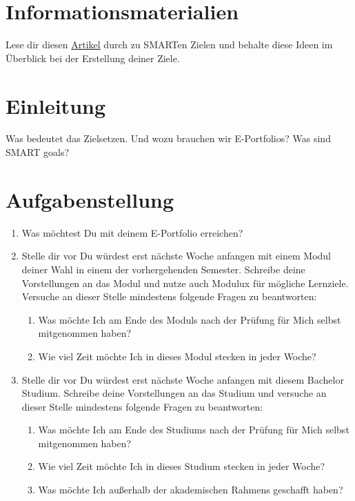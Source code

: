 \documentclass[a4paper,oneside]{scrarticle}
\begin{document}
	\pagebreak 
	
	\section*{Informationsmaterialien}
	Lese dir diesen \href{https://www.atlassian.com/blog/productivity/how-to-write-smart-goals}{Artikel} durch zu SMARTen Zielen und behalte diese Ideen im Überblick bei der Erstellung deiner Ziele.\\
	
	
	
	
	
	\pagebreak
		
	\section*{Einleitung}
	Was bedeutet das Zielsetzen. Und wozu brauchen wir E-Portfolios? Was sind SMART goals?
	
	\section*{Aufgabenstellung}

	\begin{enumerate}
		\item Was möchtest Du mit deinem E-Portfolio erreichen?
		\item Stelle dir vor Du würdest erst nächste Woche anfangen mit einem Modul deiner Wahl in einem der vorhergehenden Semester. Schreibe deine Vorstellungen an das Modul und nutze auch Modulux für mögliche Lernziele. Versuche an dieser Stelle mindestens folgende Fragen zu beantworten:
		\begin{enumerate}
			\item Was möchte Ich am Ende des Moduls nach der Prüfung für Mich selbst mitgenommen haben?
			\item Wie viel Zeit möchte Ich in dieses Modul stecken in jeder Woche?
		\end{enumerate}
		\item Stelle dir vor Du würdest erst nächste Woche anfangen mit diesem Bachelor Studium. Schreibe deine Vorstellungen an das Studium und versuche an dieser Stelle mindestens folgende Fragen zu beantworten:
		\begin{enumerate}
			\item Was möchte Ich am Ende des Studiums nach der Prüfung für Mich selbst mitgenommen haben?
			\item Wie viel Zeit möchte Ich in dieses Studium stecken in jeder Woche?
			\item Was möchte Ich außerhalb der akademischen Rahmens geschafft haben?
		\end{enumerate}

	\end{enumerate}
\end{document}
